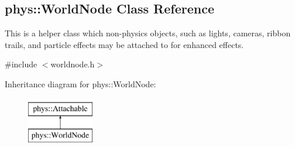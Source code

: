 \hypertarget{classphys_1_1WorldNode}{
\subsection{phys::WorldNode Class Reference}
\label{classphys_1_1WorldNode}
}


This is a helper class which non-\/physics objects, such as lights, cameras, ribbon trails, and particle effects may be attached to for enhanced effects.  




{\ttfamily \#include $<$worldnode.h$>$}

Inheritance diagram for phys::WorldNode:\begin{figure}[H]
\begin{center}
\leavevmode
\includegraphics[height=2.000000cm]{classphys_1_1WorldNode}
\end{center}
\end{figure}
